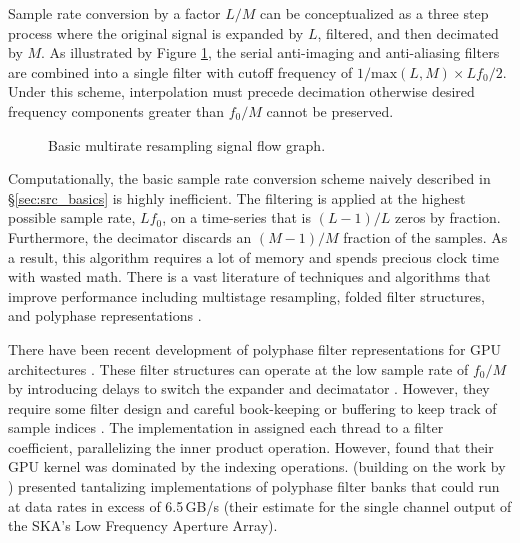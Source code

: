 \documentclass[11pt,preprint]{aastex}
\newcommand{\z}{\mathpzc{z}}
\begin{document}
Sample rate conversion by a factor $L/M$ can be conceptualized as a three step process where the original signal 
is expanded by $L$, filtered, and then decimated by $M$.  As illustrated by Figure \ref{fig:resample_basic}, 
the serial anti-imaging and 
anti-aliasing filters are combined into a single filter with cutoff frequency of 
$1/\mathrm{max}(L,M) \times Lf_0/2$.  Under this scheme, interpolation must precede decimation otherwise desired 
frequency components greater than $f_0/M$ cannot be preserved.

\begin{figure}[H!]
\centering
\label{fig:resample_basic}
\caption{Basic multirate resampling signal flow graph.}
\end{figure}

\iffalse %


\fi %

Computationally, the basic sample rate conversion scheme naively described in \S\ref{sec:src_basics} is highly 
inefficient.  The filtering is applied at the highest possible sample rate, $Lf_0$, on
a time-series that is $(L-1)/L$ zeros by fraction. Furthermore, the decimator discards an $(M-1)/M$ fraction of 
the samples.  As a result, this algorithm requires a lot of memory and spends precious clock 
time with wasted math.  There is a vast literature of techniques and algorithms that improve performance 
including multistage resampling, folded filter structures, and polyphase representations 
\citep{oppenheim10,lyons11,vaidyanathan93}.

There have been recent development of polyphase filter representations for GPU architectures 
\citep[i.e.][]{vanderveldt12,adamek14,kim14a}.  These filter structures can operate at the low sample rate of $f_0/M$
by introducing delays to switch the expander and decimatator \citep{crochiere81}.  However, they require 
some filter design and careful book-keeping or buffering to keep track of sample indices \citep{wang01}.
The implementation in \citet{kim14a} assigned each thread to a filter coefficient, parallelizing the 
inner product operation.  However, \citet{kim14a} found that their GPU kernel was dominated by the 
indexing operations.  \citet{adamek14} (building on the work by \citet{vanderveldt12}) presented tantalizing 
implementations of 
polyphase filter banks that could run at data rates in excess of 6.5\,GB/s (their estimate for the single channel 
output of the SKA's Low Frequency Aperture Array).
\end{document}
